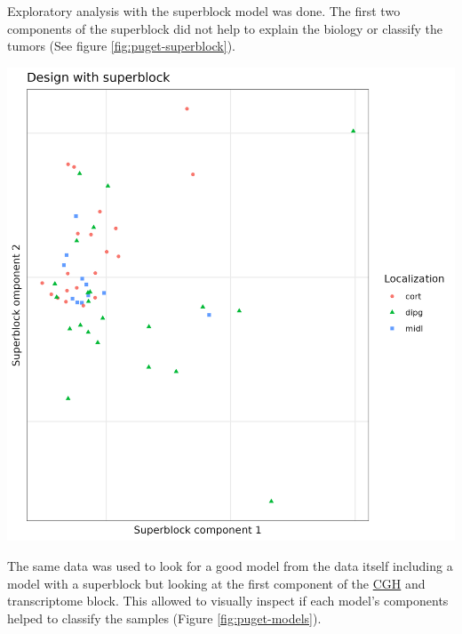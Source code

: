 \documentclass[
  12pt,
  a4paper,
  twoside,
  openright]{book}
\let\origfigure\figure
\let\endorigfigure\endfigure
\renewenvironment{figure}[1][2] {
    \expandafter\origfigure\expandafter[!htbp]
} {
    \endorigfigure
}
\begin{document}
Exploratory analysis with the superblock model was done.
The first two components of the superblock did not help to explain the biology or classify the tumors (See figure \ref{fig:puget-superblock}).

\begin{figure}
\includegraphics[width=1\linewidth]{images/pugets_superblock} \caption[Superblock components in Puget's dataset]{First components of the model superblock.2 which has all the data of the samples on the Puget's dataset. Samples colored and shaped acording to the localization of the tumor. There is a mix of samples of all locations and then some far from it.}\label{fig:puget-superblock}
\end{figure}

The same data was used to look for a good model from the data itself including a model with a superblock but looking at the first component of the \protect\hyperlink{acronyms_CGH}{CGH} and transcriptome block.
This allowed to visually inspect if each model's components helped to classify the samples (Figure \ref{fig:puget-models}).
\end{document}

